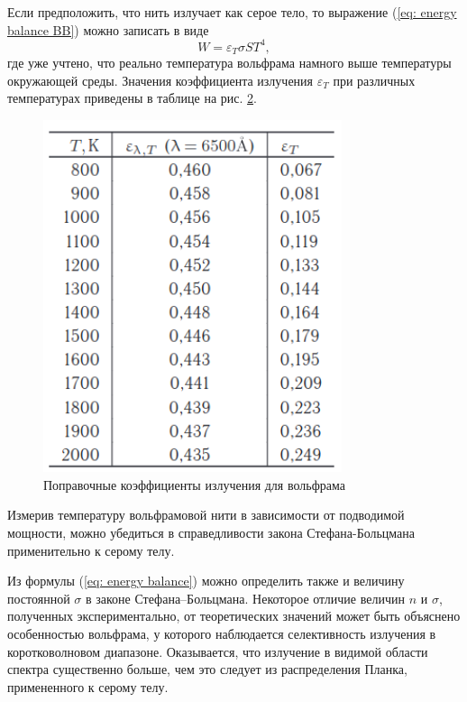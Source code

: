 \documentclass[a4paper,12pt]{article}
\begin{document}
Если предположить, что нить излучает как серое тело, то выражение (\ref{eq: energy balance BB}) можно записать в виде
\begin{equation}\label{eq: energy balance}
    W = \varepsilon_T\sigma ST^4,
\end{equation}
где уже учтено, что реально температура вольфрама намного выше температуры окружающей среды. Значения коэффициента излучения $\varepsilon_T$ при различных температурах приведены в таблице на рис. \hyperref[fig: Blackness Degree]{2}.

\begin{figure}\label{fig: Blackness Degree}
    \begin{center}
    \vspace{-20pt}
        \includegraphics[width = 0.78\textwidth]{Blackness Degree.png}
    \end{center}
    \caption{Поправочные коэффициенты излучения для вольфрама}
\end{figure}
Измерив температуру вольфрамовой нити в зависимости от подводимой мощности, можно убедиться в справедливости закона Стефана-Больцмана применительно к серому телу.

Из формулы (\ref{eq: energy balance}) можно определить также и величину постоянной $\sigma$ в законе Стефана–Больцмана. Некоторое отличие величин $n$ и $\sigma$, полученных экспериментально, от теоретических значений может быть объяснено особенностью вольфрама, у которого наблюдается селективность излучения в коротковолновом диапазоне. Оказывается, что излучение в видимой области спектра существенно больше, чем это следует из распределения Планка, примененного к серому телу.
\end{document}
